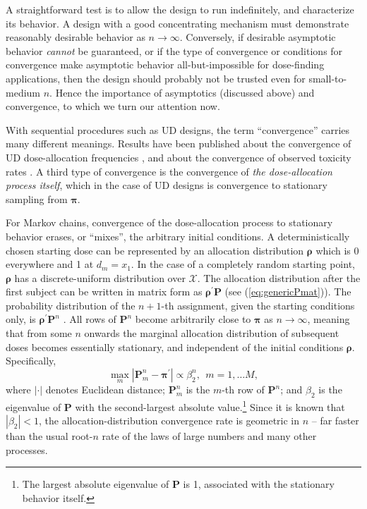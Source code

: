 A straightforward test is to allow the design to run indefinitely, and characterize its behavior. A design with a good concentrating mechanism must demonstrate reasonably desirable behavior as $n\to\infty$. Conversely, if desirable asymptotic behavior \emph{cannot} be guaranteed, or if the type of convergence or conditions for convergence make asymptotic behavior all-but-impossible for dose-finding applications, then the design should probably not be trusted even for small-to-medium $n$. Hence the importance of asymptotics (discussed above) and convergence, to which we turn our attention now.

With sequential procedures such as UD designs, the term ``convergence'' carries many different meanings. Results have been published about the convergence of UD dose-allocation frequencies \citep{Durh:Flou:up-a:1995,Durh:Flou:Mont:up-a:1995}, and about the convergence of observed toxicity rates \citep{Flou:Durh:Rose:toxi:1995,oron:azri:hoff:dose:2011}. A third type of convergence is the convergence of \emph{the dose-allocation process itself}, which in the case of UD designs is convergence to stationary sampling from $\boldsymbol{\pi}$.

For Markov chains, convergence of the dose-allocation process to stationary behavior erases, or ``mixes'', the arbitrary initial conditions. A deterministically chosen starting dose can be represented by an allocation distribution $\boldsymbol{\rho}$ which is 0 everywhere and 1 at $d_m=x_1$. In the case of a completely random starting point, $\boldsymbol{\rho}$ has a discrete-uniform distribution over $\mathcal{X}$. The allocation distribution after the first subject can be written in matrix form as $\boldsymbol{\rho}^{'}\mathbf{P}$ (see (\ref{eq:genericPmat})). The probability distribution of the $n+1$-th assignment, given the starting conditions only, is $\boldsymbol{\rho}^{'}\mathbf{P}^n$ \cite[cf.,][]{Diac:Stro:geom:1991}. All rows of $\mathbf{P}^n$ become arbitrarily close to $\boldsymbol{\pi}$ as $n\to\infty$, meaning that from some $n$ onwards the marginal allocation distribution of subsequent doses becomes essentially stationary, and independent of the initial conditions $\boldsymbol{\rho}$. Specifically,
\begin{equation}\label{eq:diac}
\max_m\left|{\mathbf{P}}^n_{m}-\boldsymbol{\pi}^\prime\right|\propto\beta_2^n,\ \ m=1,\ldots M,
\end{equation}
\noindent where $|\cdot| $ denotes Euclidean distance; ${\mathbf{P}}^n_{m}$ is the  $m$-th row of $\mathbf{P}^n$; and $\beta_2$ is the eigenvalue of $\mathbf{P}$ with the second-largest absolute value.\footnote{
The largest absolute eigenvalue of $\mathbf{P}$ is 1, associated with the stationary behavior itself.} Since it is known that $\left|\beta_2\right|<1$, the allocation-distribution convergence rate is geometric in $n$ --  far faster than the usual root-$n$ rate of the laws of large numbers and many other processes.


